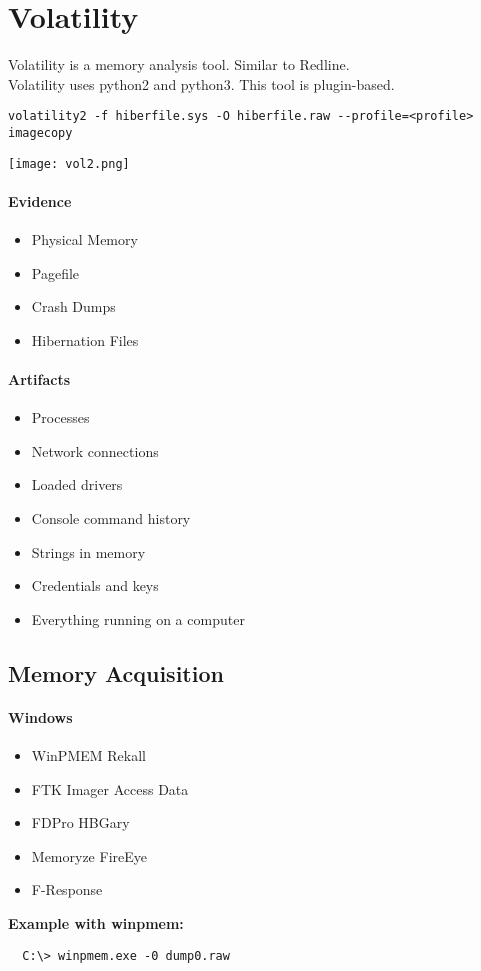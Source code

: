 \section{Volatility}
Volatility is a memory analysis tool. Similar to Redline.\\
Volatility uses python2 and python3. This tool is plugin-based.
\begin{lstlisting}
volatility2 -f hiberfile.sys -O hiberfile.raw --profile=<profile> imagecopy
\end{lstlisting}
\texttt{[image: vol2.png]}


\paragraph{Evidence}
\begin{itemize}
  \item Physical Memory
  \item Pagefile
  \item Crash Dumps
  \item Hibernation Files
\end{itemize}

\paragraph{Artifacts}
\begin{itemize}
  \item Processes
  \item Network connections
  \item Loaded drivers
  \item Console command history
  \item Strings in memory
  \item Credentials and keys
  \item Everything running on a computer
\end{itemize}

\subsection{Memory Acquisition}
\paragraph{Windows}
\begin{itemize}
  \item WinPMEM Rekall
  \item FTK Imager Access Data
  \item FDPro HBGary
  \item Memoryze FireEye
  \item F-Response
\end{itemize}
\textbf{Example with winpmem:}
\begin{lstlisting}
  C:\> winpmem.exe -0 dump0.raw
\end{lstlisting}


